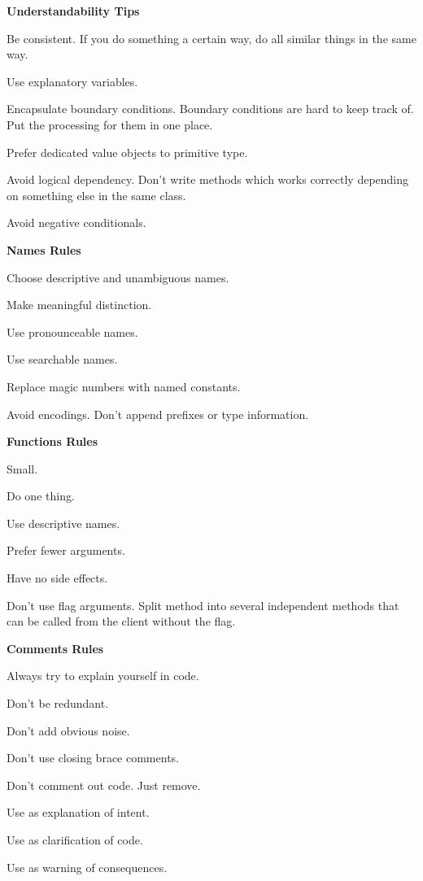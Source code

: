 \item \textbf{Understandability Tips}
\bit
\item Be consistent. If you do something a certain way, do all similar things in the same way.
\item Use explanatory variables.
\item Encapsulate boundary conditions. Boundary conditions are hard to keep track of. Put the processing for them
in one place.
\item Prefer dedicated value objects to primitive type.
\item Avoid logical dependency. Don't write methods which works correctly depending on something else in the same class.
\item Avoid negative conditionals.
\eit

\item \textbf{Names Rules}
\bit
\item Choose descriptive and unambiguous names.
\item Make meaningful distinction.
\item Use pronounceable names.
\item Use searchable names.
\item Replace magic numbers with named constants.
\item Avoid encodings. Don't append prefixes or type information.
\eit

\item \textbf{Functions Rules}
\bit
\item Small.
\item Do one thing.
\item Use descriptive names.
\item Prefer fewer arguments.
\item Have no side effects.
\item Don't use flag arguments. Split method into several independent methods that can be called from the client
without the flag.
\eit

\item \textbf{Comments Rules}
\bit
\item Always try to explain yourself in code.
\item Don't be redundant.
\item Don't add obvious noise.
\item Don't use closing brace comments.
\item Don't comment out code. Just remove.
\item Use as explanation of intent.
\item Use as clarification of code.
\item Use as warning of consequences.
\eit

